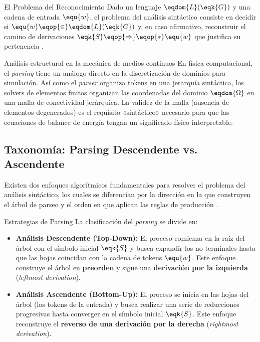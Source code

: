 \begin{definicion}{El Problema del Reconocimiento}
Dado un lenguaje $\eqdom{L}(\eqk{G})$ y una cadena de entrada $\equ{w}$, el problema del análisis sintáctico consiste en decidir si $\equ{w} \eqop{\in} \eqdom{L}(\eqk{G})$ y, en caso afirmativo, reconstruir el camino de derivaciones $\eqk{S} \eqop{\Rightarrow}\eqop{*} \equ{w}$ que justifica su pertenencia \cite{sipser2012introduction}.
\end{definicion}

\begin{fisicaconexion}{Análisis estructural en la mecánica de medios continuos}
En física computacional, el \textit{parsing} tiene un análogo directo en la discretización de dominios para simulación. Así como el \textit{parser} organiza tokens en una jerarquía sintáctica, los solvers de elementos finitos organizan las coordenadas del dominio $\eqdom{\Omega}$ en una malla de conectividad jerárquica. La validez de la malla (ausencia de elementos degenerados) es el requisito «sintáctico» necesario para que las ecuaciones de balance de energía tengan un significado físico interpretable.
\end{fisicaconexion}

\subsection{Taxonomía: Parsing Descendente vs. Ascendente}
\label{subsec:3_4_2_taxonomia}

Existen dos enfoques algorítmicos fundamentales para resolver el problema del análisis sintáctico, los cuales se diferencian por la dirección en la que construyen el árbol de parseo y el orden en que aplican las reglas de producción \cite{aho2006compilers}.

\begin{definicion}{Estrategias de Parsing}
La clasificación del \textit{parsing} se divide en:
\begin{itemize}
    \item \textbf{Análisis Descendente (Top-Down):} El proceso comienza en la raíz del árbol con el símbolo inicial $\eqk{S}$ y busca expandir los no terminales hasta que las hojas coincidan con la cadena de tokens $\equ{w}$. Este enfoque construye el árbol en \textbf{preorden} y sigue una \textbf{derivación por la izquierda} (\textit{leftmost derivation}).
    \item \textbf{Análisis Ascendente (Bottom-Up):} El proceso se inicia en las hojas del árbol (los tokens de la entrada) y busca realizar una serie de reducciones progresivas hasta converger en el símbolo inicial $\eqk{S}$. Este enfoque reconstruye el \textbf{reverso de una derivación por la derecha} (\textit{rightmost derivation}).
\end{itemize}
\end{definicion}

